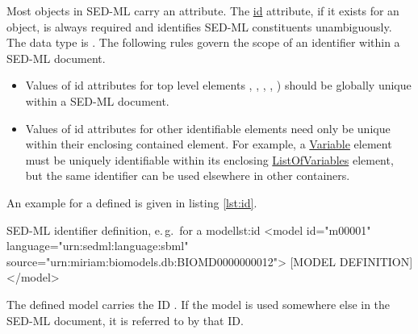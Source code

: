 \label{sec:id}
%

Most objects in SED-ML carry an  attribute. 
The \hyperref[sec:id]{id} attribute, if it exists for an object, is always required and identifies SED-ML constituents unambiguously.   
The  data type is . The following rules govern the scope of an identifier within a SED-ML document.
\begin{itemize}
\item Values of  id attributes for top level elements  , , , ,  ) should be globally unique within a SED-ML document. 
\item Values of id attributes for other identifiable elements need only be unique within their enclosing contained element. For example, a
 \hyperref[class:variable]{Variable} element must be uniquely identifiable within its enclosing  \hyperref[sec:listOfVariables] {ListOfVariables} element, but the same identifier can be used elsewhere in other containers.
\end{itemize}
An example for a defined  is given in listing \ref{lst:id}.
%
\begin{myXmlLst}{SED-ML identifier definition, e.\,g.\ for a model}{lst:id}
<model id="m00001" language="urn:sedml:language:sbml" source="urn:miriam:biomodels.db:BIOMD0000000012">
 [MODEL DEFINITION]
</model>
\end{myXmlLst}
%
The defined model carries the ID . If the model is used somewhere else in the SED-ML document, it is referred to by that ID.

